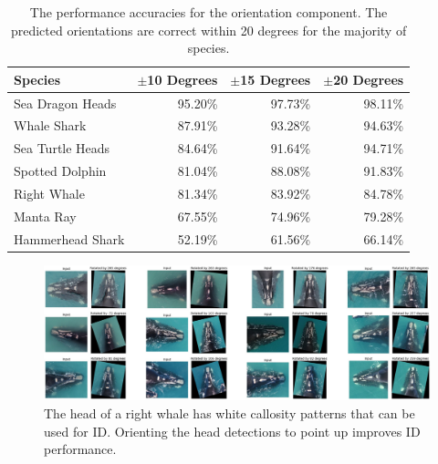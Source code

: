 \begin{table}[!t]
    \caption{The performance accuracies for the orientation component.  The predicted orientations are correct within 20 degrees for the majority of species.}
    \label{table:orient-results}
    \begin{center}
        \begin{tabular}{| l | r | r | r |}
            \hline
            \textbf{Species} & \textbf{$\pm$10 Degrees} & \textbf{$\pm$15 Degrees} & \textbf{$\pm$20 Degrees} \\
            \hline
            Sea Dragon Heads & 95.20\%                  & 97.73\%                  & 98.11\%                  \\
            \hline
            Whale Shark      & 87.91\%                  & 93.28\%                  & 94.63\%                  \\
            \hline
            Sea Turtle Heads & 84.64\%                  & 91.64\%                  & 94.71\%                  \\
            \hline
            Spotted Dolphin  & 81.04\%                  & 88.08\%                  & 91.83\%                  \\
            \hline
            Right Whale      & 81.34\%                  & 83.92\%                  & 84.78\%                  \\
            \hline
            Manta Ray        & 67.55\%                  & 74.96\%                  & 79.28\%                  \\
            \hline
            Hammerhead Shark & 52.19\%                  & 61.56\%                  & 66.14\%                  \\
            \hline
        \end{tabular}
    \end{center}
\end{table}

\begin{figure}[!t]
    \begin{center}
        \includegraphics[width=0.99\linewidth]{resources/orient-rightwhale_rotated_1.pdf}
    \end{center}
    \caption{The head of a right whale has white callosity patterns that can be used for ID.  Orienting the head detections to point up improves ID performance.}
    \label{fig:orient-rw}
\end{figure}

